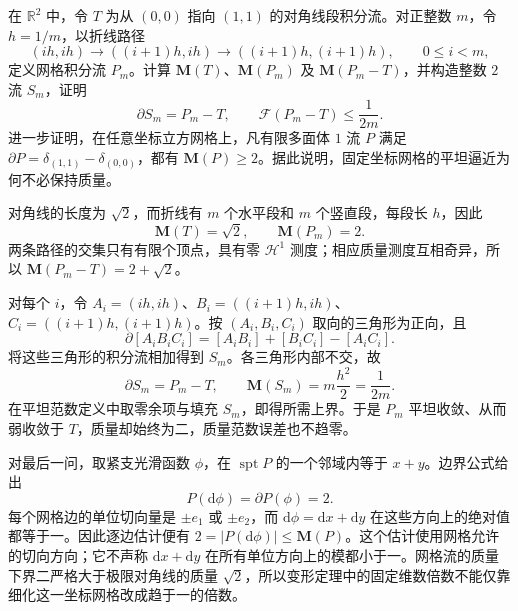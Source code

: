 \begin{exercise}\label{g3:ex:cubical-staircase-flat-mass}
	在 \(\mathbb R^2\) 中，令 \(T\) 为从 \((0,0)\) 指向 \((1,1)\) 的对角线段积分流。对正整数 \(m\)，令 \(h=1/m\)，以折线路径
	\[
	(ih,ih)\longrightarrow((i+1)h,ih)
	\longrightarrow((i+1)h,(i+1)h),\qquad 0\le i<m,
	\]
	定义网格积分流 \(P_m\)。计算 \(\mathbf M(T)\)、\(\mathbf M(P_m)\) 及 \(\mathbf M(P_m-T)\)，并构造整数 \(2\) 流 \(S_m\)，证明
	\[
	\partial S_m=P_m-T,\qquad \mathcal F(P_m-T)\le\frac1{2m}.
	\]
	进一步证明，在任意坐标立方网格上，凡有限多面体 \(1\) 流 \(P\) 满足
	\(\partial P=\delta_{(1,1)}-\delta_{(0,0)}\)，都有 \(\mathbf M(P)\ge2\)。据此说明，固定坐标网格的平坦逼近为何不必保持质量。
\end{exercise}
\begin{solution}
	对角线的长度为 \(\sqrt2\)，而折线有 \(m\) 个水平段和 \(m\) 个竖直段，每段长 \(h\)，因此
	\[
	\mathbf M(T)=\sqrt2,\qquad \mathbf M(P_m)=2.
	\]
	两条路径的交集只有有限个顶点，具有零 \(\mathcal H^1\) 测度；相应质量测度互相奇异，所以
	\(\mathbf M(P_m-T)=2+\sqrt2\)。

	对每个 \(i\)，令 \(A_i=(ih,ih)\)、\(B_i=((i+1)h,ih)\)、\(C_i=((i+1)h,(i+1)h)\)。按 \((A_i,B_i,C_i)\) 取向的三角形为正向，且
	\[
	\partial[A_iB_iC_i]=[A_iB_i]+[B_iC_i]-[A_iC_i].
	\]
	将这些三角形的积分流相加得到 \(S_m\)。各三角形内部不交，故
	\[
	\partial S_m=P_m-T,\qquad
	\mathbf M(S_m)=m\frac{h^2}{2}=\frac1{2m}.
	\]
	在平坦范数定义中取零余项与填充 \(S_m\)，即得所需上界。于是 \(P_m\) 平坦收敛、从而弱收敛于 \(T\)，质量却始终为二，质量范数误差也不趋零。

	对最后一问，取紧支光滑函数 \(\phi\)，在 \(\operatorname{spt}P\) 的一个邻域内等于 \(x+y\)。边界公式给出
	\[
	P(\mathrm d\phi)=\partial P(\phi)=2.
	\]
	每个网格边的单位切向量是 \(\pm e_1\) 或 \(\pm e_2\)，而
	\(\mathrm d\phi=\mathrm dx+\mathrm dy\) 在这些方向上的绝对值都等于一。因此逐边估计便有
	\(2=|P(\mathrm d\phi)|\le\mathbf M(P)\)。这个估计使用网格允许的切向方向；它不声称 \(\mathrm dx+\mathrm dy\) 在所有单位方向上的模都小于一。网格流的质量下界二严格大于极限对角线的质量 \(\sqrt2\)，所以变形定理中的固定维数倍数不能仅靠细化这一坐标网格改成趋于一的倍数。
\end{solution}

